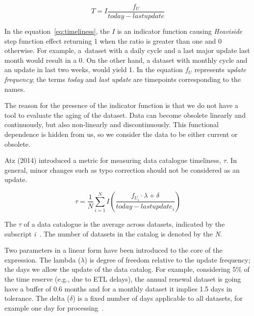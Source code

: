 \begin{equation}\label{eq:timeliness}
    T = I \frac{f_U}{today - last update}
\end{equation}

In the equation~\ref{eq:timeliness}, the \( I \) is an indicator function causing \textit{Heaviside} step function effect returning 1 when the ratio is greater than one and 0 otherwise.
For example, a~dataset with a daily cycle and a last major update last month would result in a 0.
On the other hand, a dataset with monthly cycle and an update in last two weeks, would yield 1.
In the equation \( f_U \) represents \textit{update frequency}; the terms \textit{today} and \textit{last update} are timepoints corresponding to the names.

The reason for the presence of the indicator function is that we do not have a tool to evaluate the aging of the dataset.
Data can become obsolete linearly and continuously, but also non-linearly and discontinuously.
This functional dependence is hidden from us, so we consider the data to be either current or obsolete.


Atz (2014) introduced a metric for measuring data catalogue timeliness, \( \tau \).
In general, minor changes such as typo correction should not be considered as an update.

\begin{equation*}
    \tau = \frac{1}{N} \sum_{i = 1}^N I \left( \frac{f_{U_i} \cdot \lambda + \delta}{today - {last update}_i} \right)
\end{equation*}

The \( \tau \) of a data catalogue is the average across datasets, indicated by the subscript \textit{i}~\cite{atz2014tau}.
The number of datasets in the catalog is denoted by the \textit{N}.

Two parameters in a linear form have been introduced to the core of the expression.
The lambda (\( \lambda \)) is degree of freedom relative to the update frequency; the days we allow the update of the data catalog.
For example, considering 5\% of the time reserve (e.g., due to ETL delays), the annual renewal dataset is going have a buffer of 0.6 months and for a monthly dataset it implies 1.5 days in tolerance.
The delta (\( \delta \)) is a fixed number of days applicable to all datasets, for example one day for processing~\cite{atz2014tau}.

